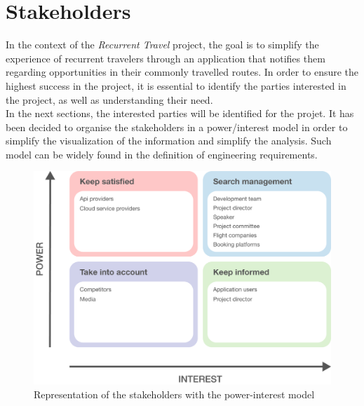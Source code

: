 \documentclass[../memory.tex]{subfiles}
\begin{document}
\section{Stakeholders}
In the context of the \emph{Recurrent Travel} project, the goal is to simplify
the experience of recurrent travelers through an application that notifies them
regarding opportunities in their commonly travelled routes. In order to ensure
the highest success in the project, it is essential to identify the parties
interested in the project, as well as understanding their need.
\\
In the next sections, the interested parties will be identified for the projet.
It has been decided to organise the stakeholders in a power/interest
model\cite{stakeholders-power-interest} in order to simplify the visualization of
the information and simplify the analysis. Such model can be widely found in
the definition of engineering requirements.
\begin{figure}[H]
	\centering
	\includegraphics[width=\textwidth]{./assets/stakeholders.png}
	\caption{Representation of the stakeholders with the power-interest model}
\end{figure}
\end{document}
